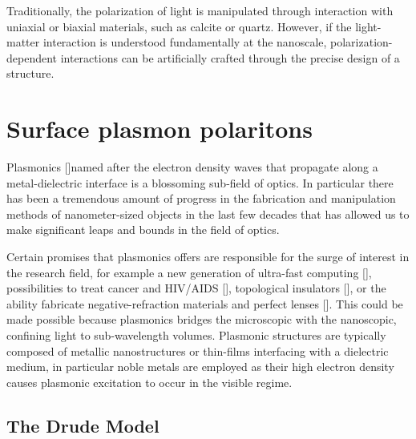 Traditionally, the polarization of light is manipulated through interaction with uniaxial or biaxial materials, such as calcite or quartz. However, if the light-matter interaction is understood fundamentally at the nanoscale, polarization-dependent interactions can be artificially crafted through the precise design of a structure. 

\section{Surface plasmon polaritons}

Plasmonics [\cite{Barnes}]\textemdash named after the electron density waves that propagate along a metal-dielectric interface is a blossoming sub-field of optics. In particular there has been a tremendous amount of progress in the fabrication and manipulation methods of nanometer-sized objects in the last few decades that has allowed us to make significant leaps and bounds in the field of optics. %

Certain promises that plasmonics offers are responsible for the surge of interest in the research field, for example a new generation of ultra-fast computing [\cite{Atwater07}], possibilities to treat cancer and HIV/AIDS [\cite{Kumar2011}], topological insulators [\cite{Deshko16}], or the ability fabricate negative-refraction materials and perfect lenses [\cite{Urbas2016}]. This could be made possible because plasmonics bridges the microscopic with the nanoscopic, confining light to sub-wavelength volumes. Plasmonic structures are typically composed of metallic nanostructures or thin-films interfacing with a dielectric medium, in particular noble metals are employed as their high electron density causes plasmonic excitation to occur in the visible regime.

\subsection{The Drude Model}


